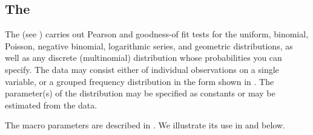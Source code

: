 \subsection{The }
The  (see ) carries out Pearson \chisq{} and \LR{} goodness-of fit tests
for the uniform, binomial, Poisson, negative binomial,
 logarithmic series, and geometric distributions,
as well as any discrete (multinomial) distribution whose probabilities you can specify.
The data may consist either of individual observations on a single
variable, or a grouped frequency distribution in the form
shown in .
The parameter(s) of the distribution may be specified as constants
or may be estimated from the data.

\begin{comment}  %
The macro is used as follows%
\footnote{In subsequent descriptions of macros in the text
we simply give references to the documentation provided in Appendix \ref{ch:macros} and provide examples of usage.}%
:
\aunote{Should we take this out?}
\begin{listing}
\%goodfit(data=\emph{SASdatasetname},
   var=\emph{variablename},
   freq=\emph{variablename},
   dist=\emph{distribution},
   parm=\emph{parameters},
   sumat=\emph{value},
   format=\emph{SASformat},
   out=\emph{outputdatasetname},
   outstat=\emph{statisticsdatasetname});
\end{listing}
\end{comment}  
The macro parameters are described in .
We illustrate its use in  and  below.

